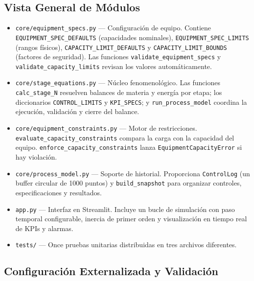 \documentclass[10pt,letterpaper]{article}
\begin{document}
\subsection{Vista General de M\'odulos}

\begin{itemize}
    \item \texttt{core/equipment\_specs.py} --- Configuraci\'on de equipo. Contiene \texttt{EQUIPMENT\_SPEC\_}\allowbreak\texttt{DEFAULTS} (capacidades nominales), \texttt{EQUIPMENT\_SPEC\_}\allowbreak\texttt{LIMITS} (rangos f\'isicos), \texttt{CAPACITY\_LIMIT\_}\allowbreak\texttt{DEFAULTS} y \texttt{CAPACITY\_LIMIT\_}\allowbreak\texttt{BOUNDS} (factores de seguridad). Las funciones \texttt{validate\_equipment\_}\allowbreak\texttt{specs} y \texttt{validate\_capacity\_}\allowbreak\texttt{limits} revisan los valores autom\'aticamente.
    \item \texttt{core/stage\_equations.py} --- N\'ucleo fenomenol\'ogico. Las funciones \texttt{calc\_stage\_N} resuelven balances de materia y energ\'ia por etapa; los diccionarios \texttt{CONTROL\_}\allowbreak\texttt{LIMITS} y \texttt{KPI\_SPECS}; y \texttt{run\_process\_}\allowbreak\texttt{model} coordina la ejecuci\'on, validaci\'on y cierre del balance.
    \item \texttt{core/equipment\_}\allowbreak\texttt{constraints.py} --- Motor de restricciones. \texttt{evaluate\_capacity\_}\allowbreak\texttt{constraints} compara la carga con la capacidad del equipo. \texttt{enforce\_}\allowbreak\texttt{capacity\_}\allowbreak\texttt{constraints} lanza \texttt{Equipment}\allowbreak\texttt{CapacityError} si hay violaci\'on.
    \item \texttt{core/process\_model.py} --- Soporte de historial. Proporciona \texttt{ControlLog} (un buffer circular de 1000 puntos) y \texttt{build\_snapshot} para organizar controles, especificaciones y resultados.
    \item \texttt{app.py} --- Interfaz en Streamlit. Incluye un bucle de simulaci\'on con paso temporal configurable, inercia de primer orden y visualizaci\'on en tiempo real de KPIs y alarmas.
    \item \texttt{tests/} --- Once pruebas unitarias distribuidas en tres archivos diferentes.
\end{itemize}

\subsection{Configuraci\'on Externalizada y Validaci\'on}
\end{document}
